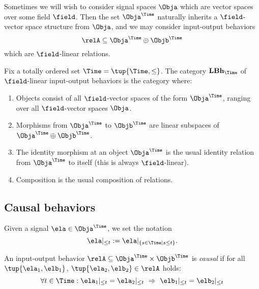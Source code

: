 Sometimes we will wish to consider signal spaces $\Obja$ which are vector spaces over some field $\field$.
Then the set $\Obja^\Time$ naturally inherits a $\field$-vector space structure from $\Obja$, and we may consider input-output behaviors
\begin{equation*}
    \relA \subseteq \Obja^\Time \oplus \Objb^\Time
\end{equation*}
which are $\field$-linear relations.

\begin{definition}
    Fix a totally ordered set $\Time = \tup{\Time, \leq}$.
    The category $\textbf{LBh}_\Time$ of $\field$-linear input-output behaviors is the category where:
    \begin{enumerate}
        \item Objects consist of all $\field$-vector spaces of the form $\Obja^\Time$, ranging over all $\field$-vector spaces $\Obja$.
        \item Morphisms from $\Obja^\Time$ to $\Objb^\Time$ are linear subspaces of  $\Obja^\Time \oplus \Objb^\Time$.
        \item The identity morphism at an object $\Obja^\Time$ is the usual identity relation from $\Obja^\Time$ to itself (this is always $\field$-linear).
        \item Composition is the usual composition of relations.
    \end{enumerate}
\end{definition}

\subsection{Causal behaviors}

Given a signal $\ela \in \Obja^\Time$, we set the notation
\begin{equation}
    \ela \vert_{\leq t} :=  \ela \vert_{\{ s \in \Time \mid s \leq t\}}.
\end{equation}

\begin{definition}
    An input-output behavior $\relA \subseteq \Obja^\Time \times \Objb^\Time$ is \emph{causal} if for all~$\tup{\ela_1, \elb_1}$, $\tup{\ela_2, \elb_2} \in \relA$ holds:
    \begin{equation}
        \forall t \in \Time: \ela_1 \vert_{ \leq t} = \ela_2 \vert_{ \leq t} \  \Rightarrow \ \elb_1 \vert_{ \leq t} = \elb_2 \vert_{ \leq t}
    \end{equation}
\end{definition}

